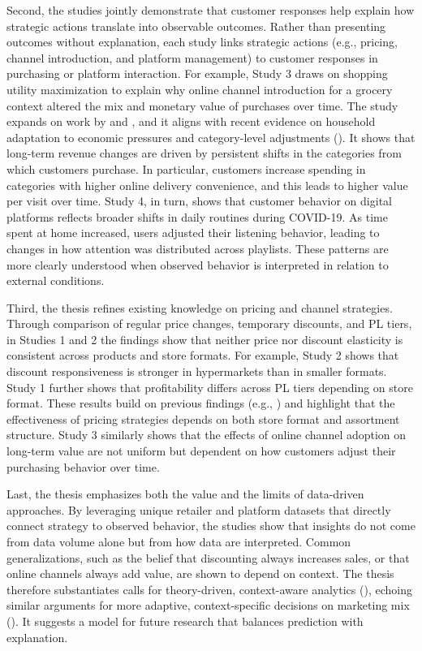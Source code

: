 Second, the studies jointly demonstrate that customer responses help explain how strategic actions translate into observable outcomes. Rather than presenting outcomes without explanation, each study links strategic actions (e.g., pricing, channel introduction, and platform management) to customer responses in purchasing or platform interaction. For example, Study 3 draws on shopping utility maximization to explain why online channel introduction for a grocery context altered the mix and monetary value of purchases over time. The study expands on work by \textcite{Campo2015-pt} and \textcite{Melis2016-mf}, and it aligns with recent evidence on household adaptation to economic pressures and category-level adjustments (\cite{Scholdra2022-rp}). It shows that long-term revenue changes are driven by persistent shifts in the categories from which customers purchase. In particular, customers increase spending in categories with higher online delivery convenience, and this leads to higher value per visit over time. Study 4, in turn, shows that customer behavior on digital platforms reflects broader shifts in daily routines during COVID-19. As time spent at home increased, users adjusted their listening behavior, leading to changes in how attention was distributed across playlists. These patterns are more clearly understood when observed behavior is interpreted in relation to external conditions.

Third, the thesis refines existing knowledge on pricing and channel strategies. Through comparison of regular price changes, temporary discounts, and PL tiers, in Studies 1 and 2 the findings show that neither price nor discount elasticity is consistent across products and store formats. For example, Study 2 shows that discount responsiveness is stronger in hypermarkets than in smaller formats. Study 1 further shows that profitability differs across PL tiers depending on store format. These results build on previous findings (e.g., \cite{Ailawadi2006-he,Shankar1996-kq,Widdecke2022-xo}) and highlight that the effectiveness of pricing strategies depends on both store format and assortment structure. Study 3 similarly shows that the effects of online channel adoption on long-term value are not uniform but dependent on how customers adjust their purchasing behavior over time.

Last, the thesis emphasizes both the value and the limits of data-driven approaches. By leveraging unique retailer and platform datasets that directly connect strategy to observed behavior, the studies show that insights do not come from data volume alone but from how data are interpreted. Common generalizations, such as the belief that discounting always increases sales, or that online channels always add value, are shown to depend on context. The thesis therefore substantiates calls for theory-driven, context-aware analytics (\cite{Dekimpe2020-bh}), echoing similar arguments for more adaptive, context-specific decisions on marketing mix (\cite{Wichmann2021-vm}). It suggests a model for future research that balances prediction with explanation.

